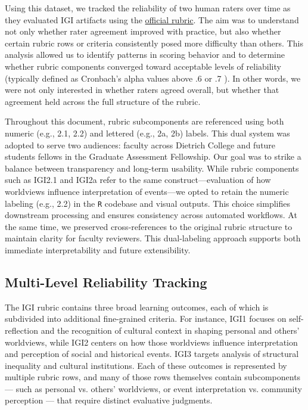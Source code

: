 \documentclass[12pt]{article}%
\begin{document}
Using this dataset, we tracked the reliability of two human raters over time as they evaluated IGI artifacts using the \href{https://docs.google.com/spreadsheets/d/1LFFnQgPI8yS5Dcm3NNLW2Vmmojya27OXNudUB8O3ja0/edit?gid=890635860#gid=890635860}{official rubric}. The aim was to understand not only whether rater agreement improved with practice, but also whether certain rubric rows or criteria consistently posed more difficulty than others. This analysis allowed us to identify patterns in scoring behavior and to determine whether rubric components converged toward acceptable levels of reliability (typically defined as Cronbach’s alpha values above .6 or .7 \cite{cronbachalpha}). In other words, we were not only interested in whether raters agreed overall, but whether that agreement held across the full structure of the rubric.

Throughout this document, rubric subcomponents are referenced using both numeric (e.g., 2.1, 2.2) and lettered (e.g., 2a, 2b) labels. This dual system was adopted to serve two audiences: faculty across Dietrich College and future students fellows in the Graduate Assessment Fellowship. Our goal was to strike a balance between transparency and long-term usability. While rubric components such as IGI2.1 and IGI2a refer to the same construct---evaluation of how worldviews influence interpretation of events---we opted to retain the numeric labeling (e.g., 2.2) in the \texttt{R} codebase and visual outputs. This choice simplifies downstream processing and ensures consistency across automated workflows. At the same time, we preserved cross-references to the original rubric structure to maintain clarity for faculty reviewers. This dual-labeling approach supports both immediate interpretability and future extensibility.

\subsection*{Multi-Level Reliability Tracking}

The IGI rubric contains three broad learning outcomes, each of which is subdivided into additional fine-grained criteria. For instance, IGI1 focuses on self-reflection and the recognition of cultural context in shaping personal and others’ worldviews, while IGI2 centers on how those worldviews influence interpretation and perception of social and historical events. IGI3 targets analysis of structural inequality and cultural institutions. Each of these outcomes is represented by multiple rubric rows, and many of those rows themselves contain subcomponents — such as personal vs. others’ worldviews, or event interpretation vs. community perception — that require distinct evaluative judgments.
\end{document}
